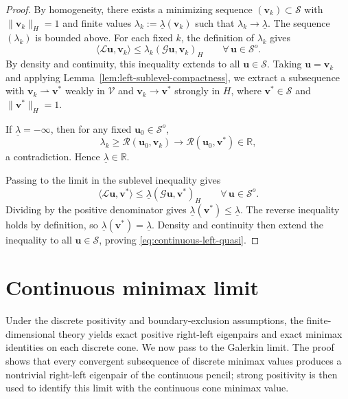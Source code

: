 \documentclass[preprint,10pt]{elsarticle}
\theoremstyle{plain}
\theoremstyle{definition}
\theoremstyle{remark}
\begin{document}
\begin{proof}
	By homogeneity, there exists a minimizing sequence
	$(\mathbf{v}_k)\subset\mathcal{S}$ with $\|\mathbf{v}_k\|_H=1$ and finite
	values $\lambda_k:=\underline\lambda(\mathbf{v}_k)$ such that
	$\lambda_k\to\underline\lambda$. The sequence $(\lambda_k)$ is bounded above.
	For each fixed $k$, the definition of $\lambda_k$ gives
	\[
	\langle\mathcal{L}\mathbf{u},\mathbf{v}_k\rangle
	\le \lambda_k(\mathcal{G}\mathbf{u},\mathbf{v}_k)_H
	\qquad \forall\,\mathbf{u}\in\mathcal{S}^o.
	\]
	By density and continuity, this inequality extends to all
	$\mathbf{u}\in\mathcal{S}$. Taking $\mathbf{u}=\mathbf{v}_k$ and applying
	Lemma~\ref{lem:left-sublevel-compactness}, we extract a subsequence with
	$\mathbf{v}_k\rightharpoonup\mathbf{v}^*$ weakly in $\mathcal{V}$ and
	$\mathbf{v}_k\to\mathbf{v}^*$ strongly in $H$, where
	$\mathbf{v}^*\in\mathcal{S}$ and $\|\mathbf{v}^*\|_H=1$.
	
	If $\underline\lambda=-\infty$, then for any fixed $\mathbf{u}_0\in\mathcal{S}^o$,
	\[
	\lambda_k \ge \mathcal{R}(\mathbf{u}_0,\mathbf{v}_k)
	\longrightarrow \mathcal{R}(\mathbf{u}_0,\mathbf{v}^*)\in\mathbb{R},
	\]
	a contradiction. Hence $\underline\lambda\in\mathbb{R}$.
	
	Passing to the limit in the sublevel inequality gives
	\[
	\langle\mathcal{L}\mathbf{u},\mathbf{v}^*\rangle
	\le \underline\lambda(\mathcal{G}\mathbf{u},\mathbf{v}^*)_H
	\qquad \forall\,\mathbf{u}\in\mathcal{S}^o.
	\]
	Dividing by the positive denominator gives
	$\underline\lambda(\mathbf{v}^*)\le\underline\lambda$. The reverse inequality
	holds by definition, so $\underline\lambda(\mathbf{v}^*)=\underline\lambda$.
	Density and continuity then extend the inequality to all
	$\mathbf{u}\in\mathcal{S}$, proving \eqref{eq:continuous-left-quasi}.
\end{proof}



\section{Continuous minimax limit}
\label{sec:pde}

Under the discrete positivity and boundary-exclusion assumptions, the
finite-dimensional theory yields exact positive right-left eigenpairs and
exact minimax identities on each discrete cone. We now pass to the Galerkin
limit. The proof shows that every convergent subsequence of discrete minimax
values produces a nontrivial right-left eigenpair of the continuous pencil;
strong positivity is then used to identify this limit with the continuous cone
minimax value.
\end{document}

